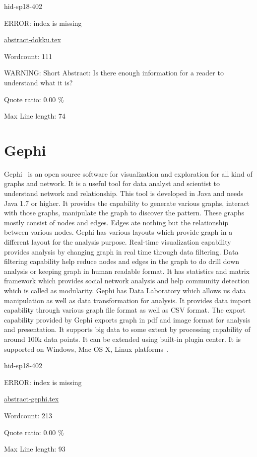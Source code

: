 \begin{IU}

hid-sp18-402

ERROR: index is missing

\href{https://github.com/cloudmesh-community/hid-sp18-402/blob/master//technology/abstract-dokku.tex}{abstract-dokku.tex}

 

Wordcount: 111

WARNING: Short Abstract: Is there enough information for a reader to understand what it is?


Quote ratio: 0.00 \%
 
Max Line length: 74
\end{IU}

\section{Gephi}
Gephi~\cite{hid-sp18-402-gephi} is an open source software for
visualization and exploration for all kind of graphs and network. It
is a useful tool for data analyst and scientist to understand network
and relationship. This tool is developed in Java and needs Java 1.7 or
higher. It provides the capability to generate various graphs, interact
with those graphs, manipulate the graph to discover the pattern. These
graphs mostly consist of nodes and edges. Edges ate nothing but the
relationship between various nodes. Gephi has various layouts which
provide graph in a different layout for the analysis purpose. Real-time
visualization capability provides analysis by changing graph in real
time through data filtering. Data filtering capability help reduce
nodes and edges in the graph to do drill down analysis or keeping
graph in human readable format.  It has statistics and matrix framework
which provides social network analysis and help community detection
which is called as modularity. Gephi has Data Laboratory which allows us data manipulation as
well as data transformation for analysis. It provides data import
capability through various graph file format as well as CSV format. The export
capability provided by Gephi exports graph in pdf and image format for
analysis and presentation. It supports big data to some extent by
processing capability of around 100k data points. It can be extended
using built-in plugin center. It is supported on Windows, Mac OS X,
Linux platforms~\cite{hid-sp18-402-gephiF}.


\begin{IU}

hid-sp18-402

ERROR: index is missing

\href{https://github.com/cloudmesh-community/hid-sp18-402/blob/master//technology/abstract-gephi.tex}{abstract-gephi.tex}

 

Wordcount: 213


Quote ratio: 0.00 \%
 
Max Line length: 93
\end{IU}

